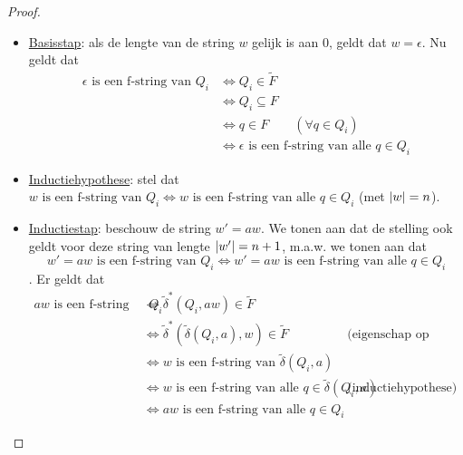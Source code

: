 \documentclass[../aanvullingen_cursus.tex]{subfiles}
\begin{document}
\begin{proof}
	\begin{itemize}
		\item \underline{Basisstap}: als de lengte van de string \(w\) gelijk is aan 0, geldt dat \(w=\epsilon\). Nu geldt dat
		\begin{equation*}
			\begin{split}
				\epsilon \text{ is een f-string van } Q_i &\Leftrightarrow Q_i \in \tilde{F} \\
				&\Leftrightarrow Q_i \subseteq F \\
				&\Leftrightarrow q \in F \qquad (\forall q \in Q_i)\\
				&\Leftrightarrow \epsilon \text{ is een f-string van alle } q \in Q_i
			\end{split}
		\end{equation*}
		\item \underline{Inductiehypothese}: stel dat \(w \text{ is een f-string van } Q_i \Leftrightarrow w \text{ is een f-string van alle } q\in Q_i \) (met \(\lvert w \rvert=n\)).
		\item \underline{Inductiestap}: beschouw de string \(w'=aw\). We tonen aan dat de stelling ook geldt voor deze string van lengte \(\lvert w' \rvert=n+1\), m.a.w. we tonen aan dat \[w'=aw \text{ is een f-string van } Q_i \Leftrightarrow w'=aw \text{ is een f-string van alle } q\in Q_i \]. Er geldt dat
		\begin{align*}
			aw \text{ is een f-string van } Q_i &\Leftrightarrow \tilde{\delta}^*(Q_i,aw) \in \tilde{F} \\
			&\Leftrightarrow \tilde{\delta}^*\left(\tilde{\delta}(Q_i,a),w\right) \in \tilde{F} && \text{(eigenschap op p.30)} \\
			&\Leftrightarrow w \text{ is een f-string van } \tilde{\delta}(Q_i,a)\\
			&\Leftrightarrow w \text{ is een f-string van alle } q \in \tilde{\delta}(Q_i,a) && \text{(inductiehypothese)} \\
			&\Leftrightarrow aw \text{ is een f-string van alle } q \in Q_i
		\end{align*}
	\end{itemize}
\end{proof}
\end{document}
